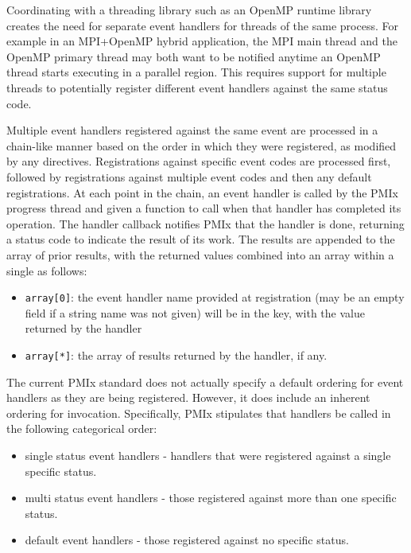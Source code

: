 Coordinating with a threading library such as an OpenMP runtime library creates the need for separate event handlers for threads of the same process. For example in an MPI+OpenMP hybrid application, the MPI main thread and the OpenMP primary thread may both want to be notified anytime an OpenMP thread starts executing in a parallel region. This requires support for multiple threads to potentially register different event handlers against the same status code.

Multiple event handlers registered against the same event are processed in a chain-like manner based on the order in which they were registered, as modified by any directives. Registrations against specific event codes are processed first, followed by registrations against multiple event codes and then any default registrations. At each point in the chain, an event handler is called by the PMIx progress thread and given a function to call when that handler has completed its operation. The handler callback notifies PMIx that the handler is done, returning a status code to indicate the result of its work. The results are appended to the array of prior results, with the returned values combined into an array within a single  as follows:
\begin{itemize}
\item \texttt{array[0]}: the event handler name provided at registration (may be an empty field if a string name was not given) will be in the key, with the  value returned by the handler
\item \texttt{array[*]}: the array of results returned by the handler, if any.
\end{itemize}

The current PMIx standard does not actually specify a default ordering for event handlers as they are being registered. However, it does include an inherent ordering for invocation. Specifically, PMIx stipulates that handlers be called in the following categorical order:

\begin{itemize}
\item single status event handlers - handlers that were registered against a single specific status.
\item multi status event handlers - those registered against more than one specific status.
\item default event handlers - those registered against no specific status.
\end{itemize}


